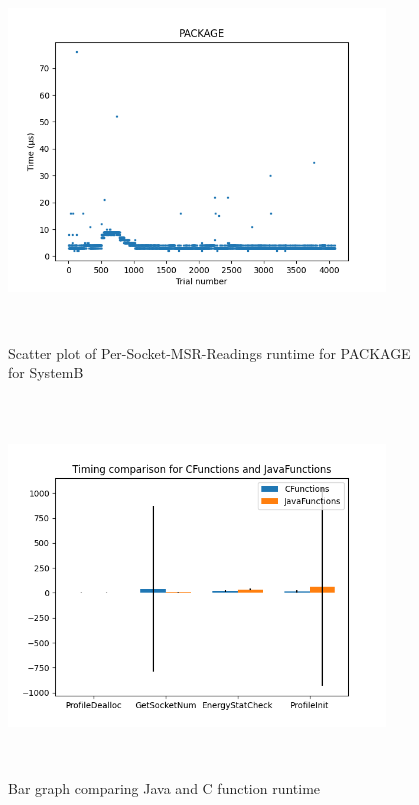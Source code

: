 \begin{figure}[H]
	\centering
	\includegraphics[width=10cm,height=10cm,keepaspectratio]{RuntimeResults_SystemB/PerSocketMSRReadings/Socket0/PACKAGE_scatter.png}
	\caption{Scatter plot of Per-Socket-MSR-Readings runtime for PACKAGE for SystemB}
	\label{fig:Per-Socket-MSR-Readings|PACKAGE|SystemB}
\end{figure}

\begin{figure}[H]
	\centering
	\includegraphics[width=10cm,height=10cm,keepaspectratio]{RuntimeResults_SystemB/CFunctions-JavaFunctions-bar_graph.png}
	\caption{Bar graph comparing Java and C function runtime}
	\label{fig:bar-graph||SystemB}
\end{figure}

